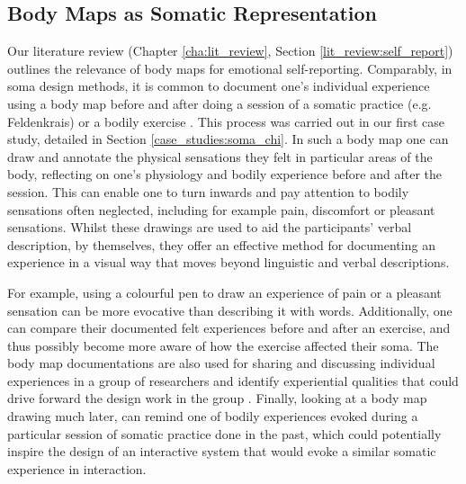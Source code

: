 
\subsection*{Body Maps as Somatic Representation}

Our literature review (Chapter \ref{cha:lit_review}, Section \ref{lit_review:self_report}) outlines the relevance of body maps for emotional self-reporting. Comparably, in soma design methods, it is common to document one's individual experience using a body map before and after doing a session of a somatic practice (e.g. Feldenkrais) or a bodily exercise \cite{windlin_soma_2019}. This process was carried out in our first case study, detailed in Section \ref{case_studies:soma_chi}. In such a body map one can draw and annotate the physical sensations they felt in particular areas of the body, reflecting on one's physiology and bodily experience before and after the session. This can enable one to turn inwards and pay attention to bodily sensations often neglected, including for example pain, discomfort or pleasant sensations. Whilst these drawings are used to aid the participants' verbal description, by themselves, they offer an effective method for documenting an experience in a visual way that moves beyond linguistic and verbal descriptions.

For example, using a colourful pen to draw an experience of pain or a pleasant sensation can be more evocative than describing it with words. Additionally, one can compare their documented felt experiences before and after an exercise, and thus possibly become more aware of how the exercise affected their soma. The body map documentations are also used for sharing and discussing individual experiences in a group of researchers and identify experiential qualities that could drive forward the design work in the group \cite{tennent_soma_2020}. Finally, looking at a body map drawing much later, can remind one of bodily experiences evoked during a particular session of somatic practice done in the past, which could potentially inspire the design of an interactive system that would evoke a similar somatic experience in interaction.

